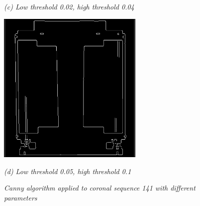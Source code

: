 \begin{figure}[htb]
\begin{minipage}[t]{2.75in}
    \centerline{\emph{(c) Low threshold 0.02, high threshold  0.04}}
  \end{minipage}\medskip
  \begin{minipage}[t]{2.75in}
    \centering
    \centerline{\mbox{\includegraphics[width=2.75in]{data_extraction/images/canny/0.05_0.1/20121017_141.eps}}}
    \centerline{\emph{(d) Low threshold 0.05, high threshold  0.1}}
  \end{minipage}
  \caption{\emph{Canny algorithm applied to coronal sequence 141 with different parameters}} \label{fig:canny_ct_141}
\end{figure}


